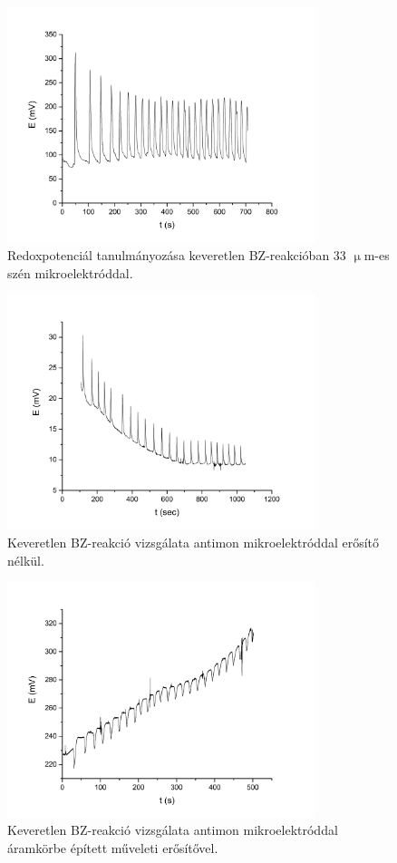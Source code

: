\begin{figure}[h]
\centering
\includegraphics[width=0.8\textwidth]{img/szen33_keveretlen.jpg}
\caption{Redoxpotenciál tanulmányozása keveretlen BZ-reakcióban 33 $\upmu$m-es szén mikroelektróddal.}
\label{fig:szen33_keveretlen}
\end{figure}


\begin{figure}[h]
\centering
\includegraphics[width=0.8\textwidth]{img/antimon_keveretlen.jpg}
\caption{Keveretlen BZ-reakció vizsgálata antimon mikroelektróddal erősítő nélkül.}
\label{fig:antimon_keveretlen}
\end{figure}

\begin{figure}[h]
\centering
\includegraphics[width=0.8\textwidth]{img/antimon_erositovel.jpg}
\caption{Keveretlen BZ-reakció vizsgálata antimon mikroelektróddal áramkörbe épített műveleti erősítővel.}
\label{fig:antimon_erositovel}
\end{figure}

